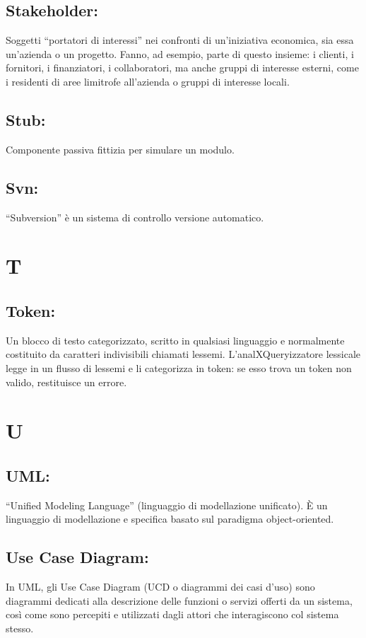 \documentclass[11pt,titlepage,a4paper]{report}
\begin{document}
\section{Stakeholder:}
Soggetti ``portatori di interessi'' nei confronti di un'iniziativa economica, sia essa un'azienda o un progetto. Fanno, ad esempio, parte di questo insieme: i clienti, i fornitori, i finanziatori, i collaboratori, ma anche gruppi di interesse esterni, come i residenti di aree limitrofe all'azienda o gruppi di interesse locali.
\section{Stub:}
Componente passiva fittizia per simulare un modulo.
\section{Svn:}
``Subversion'' \`e un sistema di controllo versione automatico. 

\chapter{T}
\section{Token:}
Un blocco di testo categorizzato, scritto in qualsiasi linguaggio e normalmente costituito da caratteri indivisibili chiamati lessemi. L'analXQueryizzatore lessicale legge in un flusso di lessemi e li categorizza in token: se esso trova un token non valido, restituisce un errore.

\chapter{U}
\section{UML:}
``Unified Modeling Language'' (linguaggio di modellazione unificato). \`E un linguaggio di modellazione e specifica basato sul paradigma object-oriented.
\section{Use Case Diagram:}
In UML, gli Use Case Diagram (UCD o diagrammi dei casi d'uso) sono diagrammi dedicati alla descrizione delle funzioni o servizi offerti da un sistema, cos\`i come sono percepiti e utilizzati dagli attori che interagiscono col sistema stesso. 
\end{document}
